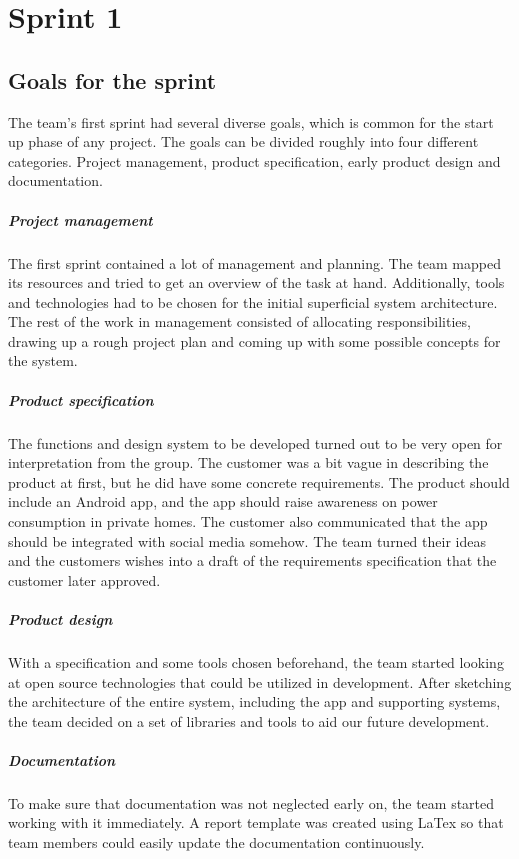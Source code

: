 \section{Sprint 1}

\subsection{Goals for the sprint}
The team's first sprint had several diverse goals, which is common for the start up phase of any project. The goals can be divided roughly into four different categories. Project management, product specification, early product design and documentation.

\subparagraph{Project management}
The first sprint contained a lot of management and planning. The team mapped its resources and tried to get an overview of the task at hand. Additionally, tools and technologies had to be chosen for the initial superficial system architecture. The rest of the work in management consisted of allocating responsibilities, drawing up a rough project plan and coming up with some possible concepts for the system.

\subparagraph{Product specification}
The functions and design system to be developed turned out to be very open for interpretation from the group. The customer was a bit vague in describing the product at first, but he did have some concrete requirements. The product should include an Android app, and the app should raise awareness on power consumption in private homes. The customer also communicated that the app should be integrated with social media somehow. The team turned their ideas and the customers wishes into a draft of the requirements specification that the customer later approved.

\subparagraph{Product design}
With a specification and some tools chosen beforehand, the team started looking at open source technologies that could be utilized in development. After sketching the architecture of the entire system, including the app and supporting systems, the team decided on a set of libraries and tools to aid our future development.

\subparagraph{Documentation}
To make sure that documentation was not neglected early on, the team started working with it immediately. A report template was created using LaTex so that team members could easily update the documentation continuously.


